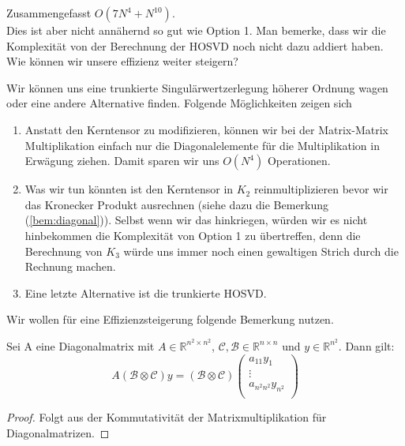 Zusammengefasst $O(7N^4+N^{10})$. \\ Dies ist aber nicht annähernd so gut wie Option 1. Man bemerke, dass wir die Komplexität von der Berechnung der HOSVD noch nicht dazu addiert haben. Wie können wir unsere effizienz weiter steigern?

Wir können uns eine trunkierte Singulärwertzerlegung höherer Ordnung  wagen oder eine andere Alternative finden. Folgende Möglichkeiten zeigen sich

\begin{enumerate}
\item Anstatt den Kerntensor zu modifizieren, können wir bei der Matrix-Matrix Multiplikation einfach nur die Diagonalelemente für die Multiplikation in Erwägung ziehen. Damit sparen wir uns $O(N^4)$ Operationen.

\item Was wir tun könnten ist den Kerntensor in $K_2$ reinmultiplizieren bevor wir das Kronecker Produkt ausrechnen (siehe dazu die Bemerkung (\ref{bem:diagonal})). Selbst wenn wir das hinkriegen, würden wir es nicht hinbekommen die Komplexität von Option 1 zu übertreffen, denn die Berechnung von $K_3$ würde uns immer noch einen gewaltigen Strich durch die Rechnung machen.

\item Eine letzte Alternative ist die trunkierte HOSVD.

\end{enumerate} 

Wir wollen für eine Effizienzsteigerung folgende Bemerkung nutzen.

\begin{Bemerkung} \label{bem:diagonal}
Sei A eine Diagonalmatrix mit $A \in \mathbb{R}^{n^2 \times n^2}$, $\mathcal{C},\mathcal{B} \in \mathbb{R}^{n \times n}$ und $y \in \mathbb{R}^{n^2}$. Dann gilt:
\begin{equation*}
A(\mathcal{B} \otimes \mathcal{C})y = (\mathcal{B} \otimes \mathcal{C}) 
\begin{pmatrix}
a_{11} y_1 \\ \vdots \\ a_{n^2 n^2} y_{n^2} \\
\end{pmatrix}
\end{equation*}
\begin{proof}
Folgt aus der Kommutativität der Matrixmultiplikation für Diagonalmatrizen.
\end{proof}
\end{Bemerkung}


